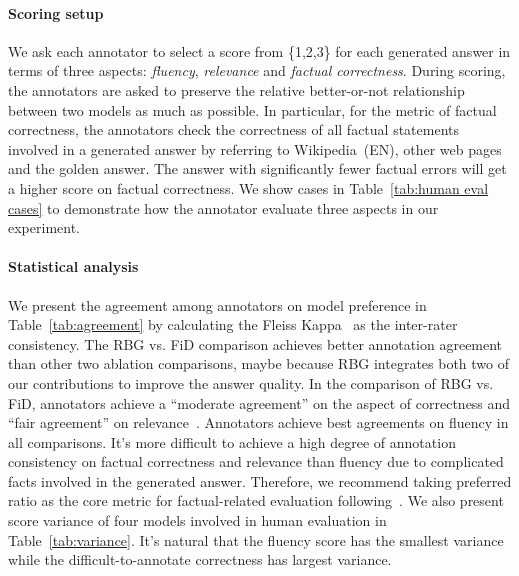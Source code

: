 \documentclass[11pt]{article}
\begin{document}
\paragraph{Scoring setup} We ask each annotator to select a score from \{1,2,3\} for each generated answer in terms of three aspects: \textit{fluency}, \textit{relevance} and \textit{factual correctness}. During scoring, the annotators are asked to preserve the relative better-or-not relationship between two models as much as possible. In particular, for the metric of factual correctness, the annotators check the correctness of all factual statements involved in a generated answer by referring to Wikipedia~(EN), other web pages and the golden answer. The answer with significantly fewer factual errors will get a higher score on factual correctness. We show cases in Table~\ref{tab:human eval cases} to demonstrate how the annotator evaluate three aspects in our experiment.

\paragraph{Statistical analysis} We present the agreement among annotators on model preference in Table~\ref{tab:agreement} by calculating the Fleiss Kappa~\cite{fleiss_kappa} as the inter-rater consistency. The RBG vs. FiD comparison achieves better annotation agreement than other two ablation comparisons, maybe because RBG integrates both two of our contributions to improve the answer quality. In the comparison of RBG vs. FiD, annotators achieve a ``moderate agreement'' on the aspect of correctness and ``fair agreement'' on relevance~\cite{landis1977measurement}. Annotators achieve best agreements on fluency in all comparisons. It's more difficult to achieve a high degree of annotation consistency on factual correctness and relevance than fluency due to complicated facts involved in the generated answer. Therefore, we recommend taking preferred ratio as the core metric for factual-related evaluation following~\cite{krishna2021hurdles,nakano2021webgpt}. We also present score variance of four models involved in human evaluation in Table~\ref{tab:variance}. It's natural that the fluency score has the smallest variance while the difficult-to-annotate correctness has largest variance.
\end{document}
